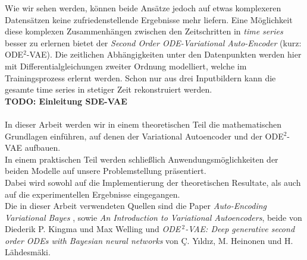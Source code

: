 \documentclass[12pt]{article}
\begin{document}
	Wie wir sehen werden, können beide Ansätze jedoch auf etwas komplexeren Datensätzen keine zufriedenstellende Ergebnisse mehr liefern.
	Eine Möglichkeit diese komplexen Zusammenhängen zwischen den Zeitschritten in \emph{time series} besser zu erlernen bietet der \emph{Second Order ODE-Variational Auto-Encoder} (kurz: ODE$^2$-VAE). Die zeitlichen Abhängigkeiten unter den Datenpunkten werden hier mit Differentialgleichungen zweiter Ordnung modelliert, welche im Trainingsprozess erlernt werden. Schon nur aus drei Inputbildern kann die gesamte time series in stetiger Zeit rekonstruiert werden.\\
	\textbf{TODO: Einleitung SDE-VAE}
	\\
	\\
	In dieser Arbeit werden wir in einem theoretischen Teil die mathematischen Grundlagen einführen, auf denen der Variational Autoencoder und der ODE$^2$-VAE aufbauen.\\
	In einem praktischen Teil werden schließlich Anwendungsmöglichkeiten der beiden Modelle auf unsere Problemstellung präsentiert.\\
	Dabei wird sowohl auf die Implementierung der
	theoretischen Resultate, als auch auf die experimentellen Ergebnisse eingegangen.\\
	Die in dieser Arbeit verwendeten Quellen sind die Paper \emph{Auto-Encoding Variational Bayes} \cite{vae}, sowie \emph{An Introduction to Variational Autoencoders}, \cite{intvae} beide von Diederik P. Kingma und Max Welling und \emph{ODE$^{\ 2}$-VAE: Deep generative second order ODEs with Bayesian neural networks} \cite{ode2vae} von Ç. Yıldız, M. Heinonen und H. Lähdesmäki.
	\newpage
\end{document}
